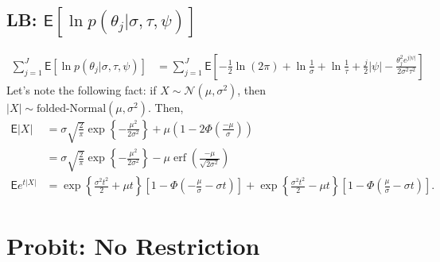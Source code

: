 \documentclass[11pt]{article}
\newcommand{\opn}{\operatorname}
\begin{document}
\subsection{LB: $\mathsf{E}\left[\ln p\left(\theta_{j}|\sigma, \tau, \psi\right)\right]$}
\begin{align*}
  \sum_{j=1}^{J}\mathsf{E}\left[\ln p\left(\theta_{j}|\sigma, \tau, \psi\right)\right] &= \sum_{j=1}^{J}\mathsf{E}\left[-\frac{1}{2}\ln\left(2\pi\right) +\ln \frac{1}{\sigma} + \ln \frac{1}{\tau} +\frac{j}{2}\left|\psi\right| -\frac{\theta_{j}^{2}e^{j\left|\psi\right|}}{2\sigma^{2}\tau^{2}} \right]
\end{align*}
Let's note the following fact: if $X \sim \mathcal{N}\left(\mu, \sigma^{2}\right)$, then $\left|X\right| \sim \text{folded-Normal}\left(\mu, \sigma^{2}\right)$. Then,
\begin{align*}
  \mathsf{E}\left|X\right| &= \sigma \sqrt{\frac{2}{\pi}}\exp \left\{-\frac{\mu^{2}}{2\sigma^{2}} \right\} + \mu \left(1-2\Phi\left(\frac{-\mu}{\sigma}\right)\right)\\
  &= \sigma \sqrt{\frac{2}{\pi}}\exp \left\{-\frac{\mu^{2}}{2\sigma^{2}} \right\} - \mu \opn{erf} \left(\frac{-\mu}{\sqrt{2\sigma^{2}}}\right)\\
  \mathsf{E}e^{t\left|X\right|} &= \exp\left\{\frac{\sigma^{2}t^{2}}{2} + \mu t \right\} \left[1-\Phi\left(-\frac{\mu}{\sigma}-\sigma t\right) \right] + \exp\left\{\frac{\sigma^{2}t^{2}}{2} -\mu t \right\}\left[1-\Phi\left(\frac{\mu}{\sigma}-\sigma t\right) \right].
\end{align*}

\section{Probit: No Restriction}
\end{document}
